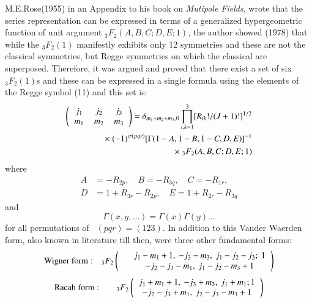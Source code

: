 M.E.Rose(1955) in an Appendix to his book on \textit{Mutipole Fields}, wrote that the series representation can be expressed in terms of a generalized hypergeometric function of unit argument ${}_3F_2(A, B, C; D, E; 1)$,  the author showed (1978) that while the $_3F_2(1)$ manifestly exhibits only 12 symmetries and these are not the classical symmetries, but Regge symmetries on which the classical are superposed. Therefore, it was argued and proved that there exist a set of six $_3F_2(1)$s and these can be expressed in a single formula using the elements of the Regge symbol (11) and this set is:
\begin{equation}
\begin{split}
\left(
\begin{tabular}{ccc}
$j_1$&  $j_2$& $j_3$ \\ $m_1$& $m_2$& $m_3$ \\ 
\end{tabular}
\right) 
=  \delta_{m_1+m_2+m_3,0} \prod_{i,k=1}^3 [R_{ik}!/(J+1)!]^{1/2}\\
\times \ (-1)^{\sigma(pqr)} [\Gamma(1-A, 1-B, 1-C, D, E)]^{-1}\\
\times \ {}_3F_2(A, B, C; D, E; 1)\hfill \label{chap29-eq13}
\end{split}
\end{equation}
where
\begin{equation}
\begin{split}
A & =-R_{2p},\quad B=-R_{3q},\quad C=-R_{1r},\\
D & =1+R_{3r}-R_{2p},\quad E=1+R_{2r}-R_{3q} \label{chap29-eq14}
\end{split}
\end{equation}
and 
\begin{equation}
\Gamma(x,y,\ldots)=\Gamma(x)\Gamma(y)\ldots \label{chap29-eq15}
\end{equation}
for all permutations of \ $(pqr)=(123)$. In addition to this Vander Waerden form, also known in literature till then, were three other fundamental forms:
\begin{equation}
{\rm Wigner\ form:}\quad {}_3F_2
\left(
\begin{tabular}{lc}
&$j_1-m_1+1,\ -j_3-m_3,\ j_1-j_2-j_3;\ 1$\\
&$-j_2-j_3-m_1,\ j_1-j_2-m_3+1$\\ 
\end{tabular} 
\right) \label{chap29-eq16}
\end{equation}
\smallskip
\begin{equation}
{\rm Racah\ form:}\qquad {}_3F_2
\left(
\begin{tabular}{c}
$j_1+m_1+1,\ -j_3+m_3,\ j_1+m_1; 1$\\
$-j_2-j_3+m_1,\ j_2-j_3-m_3+1$\\ 
\end{tabular} 
\right) \label{chap29-eq17}
\end{equation}
